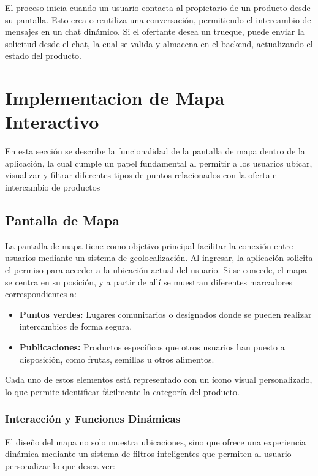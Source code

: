 \documentclass[11pt, a4paper, oneside]{book}
\begin{document}
El proceso inicia cuando un usuario contacta al propietario de un producto desde su pantalla. Esto crea o reutiliza una conversación, permitiendo el intercambio de mensajes en un chat dinámico. Si el ofertante desea un trueque, puede enviar la solicitud desde el chat, la cual se valida y almacena en el backend, actualizando el estado del producto.



\chapter{Implementacion de Mapa Interactivo }

\noindent En esta sección se describe la funcionalidad de la pantalla de mapa dentro de la aplicación, la cual cumple un papel fundamental al permitir a los usuarios ubicar, visualizar y filtrar diferentes tipos de puntos relacionados con la oferta e intercambio de productos

 

\section{Pantalla de Mapa}

 

\noindent 
La pantalla de mapa tiene como objetivo principal facilitar la conexión entre usuarios mediante un sistema de geolocalización. Al ingresar, la aplicación solicita el permiso para acceder a la ubicación actual del usuario. Si se concede, el mapa se centra en su posición, y a partir de allí se muestran diferentes marcadores correspondientes a:

\begin{itemize}
    \item \textbf{Puntos verdes:} Lugares comunitarios o designados donde se pueden realizar intercambios de forma segura.
    \item \textbf{Publicaciones:} Productos específicos que otros usuarios han puesto a disposición, como frutas, semillas u otros alimentos.
\end{itemize}
Cada uno de estos elementos está representado con un ícono visual personalizado, lo que permite identificar fácilmente la categoría del producto.

\subsection{Interacción y Funciones Dinámicas}

El diseño del mapa no solo muestra ubicaciones, sino que ofrece una experiencia dinámica mediante un sistema de filtros inteligentes que permiten al usuario personalizar lo que desea ver:
\end{document}
